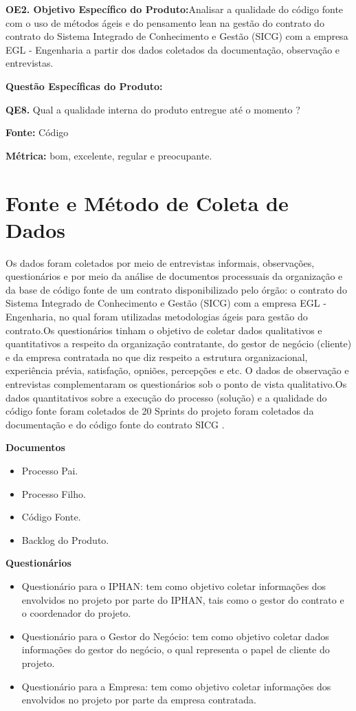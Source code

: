  \vspace{\onelineskip} 

\textbf{OE2. Objetivo Específico do Produto:}Analisar a qualidade do código fonte com o uso de métodos ágeis e do pensamento lean na gestão do contrato do contrato do Sistema Integrado 
de Conhecimento e Gestão (SICG) com a empresa EGL - Engenharia a partir dos dados coletados da documentação, observação e entrevistas.

\textbf{Questão Específicas do Produto:}

\textbf{QE8.} Qual a qualidade interna do produto entregue até o momento ?

\textbf{Fonte:} Código

\textbf{Métrica:} bom, excelente, regular e preocupante.


\section[Fonte e Método Coleta de Dados]{Fonte e Método de Coleta de Dados}

Os dados foram coletados por meio de entrevistas informais, observações, questionários e por meio da análise de documentos processuais da organização e da base de código fonte de um contrato disponibilizado pelo órgão: o contrato do Sistema Integrado de Conhecimento e Gestão (SICG) com a empresa EGL - Engenharia, no qual foram utilizadas metodologias ágeis para gestão do contrato.Os questionários tinham o objetivo de coletar dados qualitativos e
quantitativos a respeito da organização contratante, do gestor de negócio (cliente) e da empresa contratada no que diz respeito a estrutura organizacional, experiência prévia, satisfação, opniões, percepções e etc. O dados de observação e entrevistas
complementaram os questionários sob o ponto de vista qualitativo.Os dados quantitativos
sobre a execução do processo (solução) e a qualidade do código fonte foram coletados de 20 Sprints do projeto foram coletados da documentação e do código fonte do contrato SICG .

\textbf{Documentos}
\begin{itemize}
\item Processo Pai.
\item Processo Filho.
\item Código Fonte.
\item Backlog do Produto.
\end{itemize}

\textbf{Questionários}
\begin{itemize}
\item Questionário para o IPHAN: tem como objetivo coletar informações dos envolvidos no projeto por parte do IPHAN, tais como o gestor do contrato e o coordenador do projeto.
\item Questionário para o Gestor do Negócio: tem como objetivo coletar dados informações do gestor do negócio, o qual representa o papel de cliente do projeto. 
\item Questionário para a Empresa: tem como objetivo coletar informações dos envolvidos no projeto por parte da empresa contratada.
\end{itemize}


